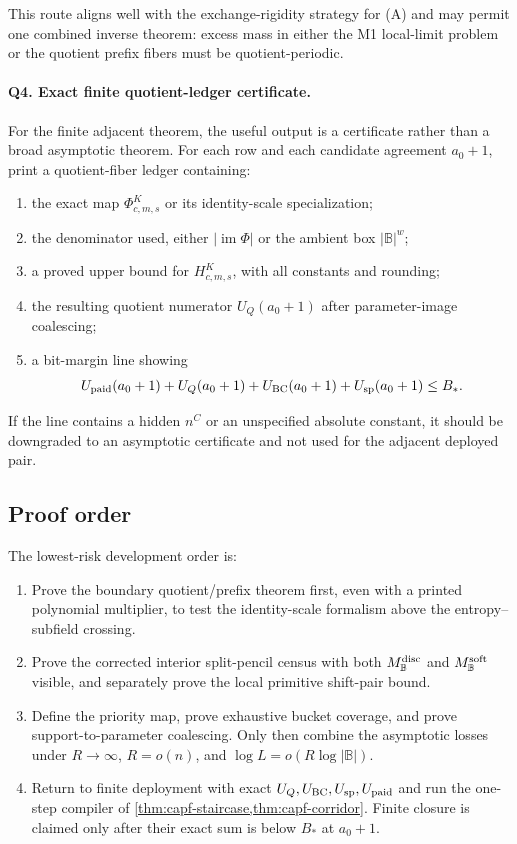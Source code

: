 \documentclass[11pt]{article}
\theoremstyle{definition}
\theoremstyle{remark}
\newcommand{\B}{\mathbb{B}}
\begin{document}
This route aligns well with the exchange-rigidity strategy for \textup{(A)} and may permit one combined inverse theorem: excess mass in either the M1 local-limit problem or the quotient prefix fibers must be quotient-periodic.

\paragraph{Q4. Exact finite quotient-ledger certificate.}
For the finite adjacent theorem, the useful output is a certificate rather than a broad asymptotic theorem.  For each row and each candidate agreement $a_0+1$, print a quotient-fiber ledger containing:
\begin{enumerate}[label=\textup{Q4.\arabic*},leftmargin=3.0em]
\item the exact map $\Phi_{c,m,s}^{K}$ or its identity-scale specialization;
\item the denominator used, either $|\operatorname{im}\Phi|$ or the ambient box $|\B|^w$;
\item a proved upper bound for $H_{c,m,s}^{K}$, with all constants and rounding;
\item the resulting quotient numerator $U_Q(a_0+1)$ after parameter-image coalescing;
\item a bit-margin line showing
\[
        U_{\rm paid}(a_0+1)+U_Q(a_0+1)+U_{\rm BC}(a_0+1)+U_{\rm sp}(a_0+1)\le B_* .
\]
\end{enumerate}
If the line contains a hidden $n^{C}$ or an unspecified absolute constant, it should be downgraded to an asymptotic certificate and not used for the adjacent deployed pair.

\subsection{Proof order}\label{subsec:capfaq-order}

The lowest-risk development order is:
\begin{enumerate}[label=\textup{(\arabic*)},leftmargin=2.5em]
\item Prove the boundary quotient/prefix theorem first, even with a printed polynomial multiplier, to test the identity-scale formalism above the entropy--subfield crossing.
\item Prove the corrected interior split-pencil census with both $M_{\B}^{\rm disc}$ and $M_{\B}^{\rm soft}$ visible, and separately prove the local primitive shift-pair bound.
\item Define the priority map, prove exhaustive bucket coverage, and prove support-to-parameter coalescing.  Only then combine the asymptotic losses under $R\to\infty$, $R=o(n)$, and $\log L=o(R\log|\B|)$.
\item Return to finite deployment with exact $U_Q,U_{\rm BC},U_{\rm sp},U_{\rm paid}$ and run the one-step compiler of \cref{thm:capf-staircase,thm:capf-corridor}.  Finite closure is claimed only after their exact sum is below $B_*$ at $a_0+1$.
\end{enumerate}
\end{document}
